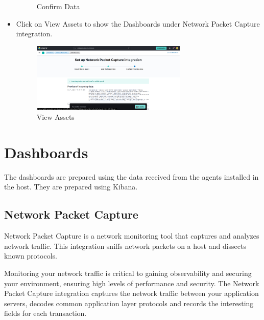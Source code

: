 \documentclass{report}
\begin{document}
\begin{itemize}
\begin{figure}
		\caption{Confirm Data}
		\label{fig:Confirm Data}
	\end{figure}
	\item Click on View Assets to show the Dashboards under Network Packet Capture integration.
	\begin {figure}
		\centering
		\includegraphics[width=0.7\textwidth]{Images/view-assets.png}
		\caption{View Assets}
		\label{fig:View Assets}
	\end{figure}
\end{itemize}

\section{Dashboards}
The dashboards are prepared using the data received from the agents installed in the host. 
They are prepared using Kibana.

\subsection{Network Packet Capture}
Network Packet Capture is a network monitoring tool that captures and analyzes network traffic.
This integration sniffs network packets on a host and dissects known protocols.

Monitoring your network traffic is critical to gaining observability and securing your environment, 
ensuring high levels of performance and security. 
The Network Packet Capture integration captures the network traffic between your application servers, 
decodes common application layer protocols and records the interesting fields for each transaction.
\end{document}

